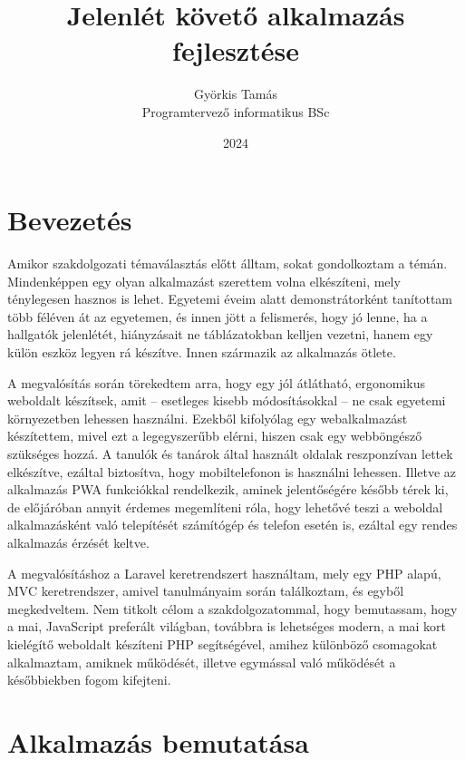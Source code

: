 \documentclass[
]{thesis-ekf}
\theoremstyle{definition}
\theoremstyle{remark}
\begin{document}
\title{Jelenlét követő alkalmazás fejlesztése}
\author{Györkis Tamás\\Programtervező informatikus BSc}
\date{2024}
\maketitle
\tableofcontents

\chapter*{Bevezetés}
Amikor szakdolgozati témaválasztás előtt álltam, sokat gondolkoztam a témán. Mindenképpen egy olyan alkalmazást szerettem volna elkészíteni, mely ténylegesen hasznos is lehet. Egyetemi éveim alatt demonstrátorként tanítottam több féléven át az egyetemen, és innen jött a felismerés, hogy jó lenne, ha a hallgatók jelenlétét, hiányzásait ne táblázatokban kelljen vezetni, hanem egy külön eszköz legyen rá készítve. Innen származik az alkalmazás ötlete.

A megvalósítás során törekedtem arra, hogy egy jól átlátható, ergonomikus weboldalt készítsek, amit -- esetleges kisebb módosításokkal -- ne csak egyetemi környezetben lehessen használni. Ezekből kifolyólag egy webalkalmazást készítettem, mivel ezt a legegyszerűbb elérni, hiszen csak egy webböngésző szükséges hozzá. A tanulók és tanárok által használt oldalak reszponzívan lettek elkészítve, ezáltal biztosítva, hogy mobiltelefonon is használni lehessen. Illetve az alkalmazás PWA funkciókkal rendelkezik, aminek jelentőségére később térek ki, de előjáróban annyit érdemes megemlíteni róla, hogy lehetővé teszi a weboldal alkalmazásként való telepítését számítógép és telefon esetén is, ezáltal egy rendes alkalmazás érzését keltve.

A megvalósításhoz a Laravel keretrendszert használtam, mely egy PHP alapú, MVC keretrendszer, amivel tanulmányaim során találkoztam, és egyből megkedveltem. Nem titkolt célom a szakdolgozatommal, hogy bemutassam, hogy a mai, JavaScript preferált világban, továbbra is lehetséges modern, a mai kort kielégítő weboldalt készíteni PHP segítségével, amihez különböző csomagokat alkalmaztam, amiknek működését, illetve egymással való működését a későbbiekben fogom kifejteni.

\chapter{Alkalmazás bemutatása}
\end{document}
